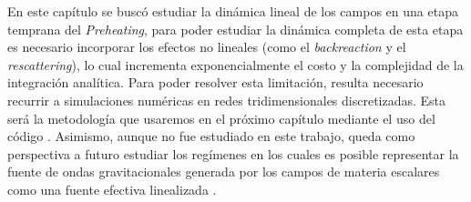 En este capítulo se buscó estudiar la dinámica lineal de los campos en una etapa temprana del \textit{Preheating}, para poder estudiar la dinámica completa de esta etapa es necesario incorporar los efectos no lineales (como el \textit{backreaction} y el \textit{rescattering}), lo cual incrementa exponencialmente el costo y la complejidad de la integración analítica. Para poder resolver esta limitación, resulta necesario recurrir a simulaciones numéricas en redes tridimensionales discretizadas. Esta será la metodología que usaremos en el próximo capítulo mediante el uso del código \CosmoLattice. Asimismo, aunque no fue estudiado en este trabajo, queda como perspectiva a futuro estudiar los regímenes en los cuales es posible representar la fuente de ondas gravitacionales generada por los campos de materia escalares como una fuente efectiva linealizada \cite{Elia_2026}.
